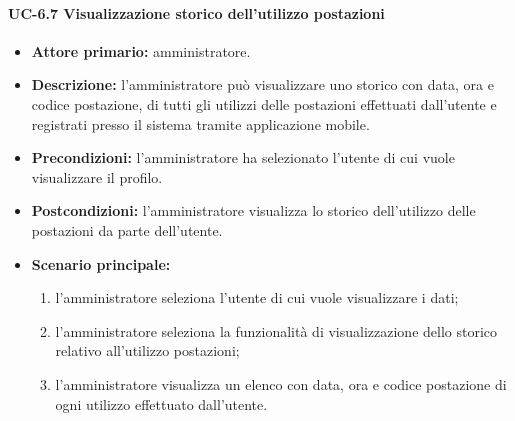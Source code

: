     \paragraph{UC-6.7 Visualizzazione storico dell'utilizzo postazioni}
    \begin{itemize}
        \item \textbf{Attore primario:} amministratore.
        
        \item \textbf{Descrizione:} l'amministratore può visualizzare uno storico con data, ora e codice postazione, di tutti gli utilizzi delle postazioni effettuati dall'utente e registrati presso il sistema tramite applicazione mobile.
        
        \item \textbf{Precondizioni:} l'amministratore ha selezionato l'utente di cui vuole visualizzare il profilo.
    
        \item \textbf{Postcondizioni:} l'amministratore visualizza lo storico dell'utilizzo delle postazioni da parte dell'utente.
    
        \item \textbf{Scenario principale:}
        \begin{enumerate}
            \item  l'amministratore seleziona l'utente di cui vuole visualizzare i dati;
            \item  l'amministratore seleziona la funzionalità di visualizzazione dello storico relativo all'utilizzo postazioni;
            \item l'amministratore visualizza un elenco con data, ora e codice postazione di ogni utilizzo effettuato dall'utente.
        \end{enumerate}
    \end{itemize}

